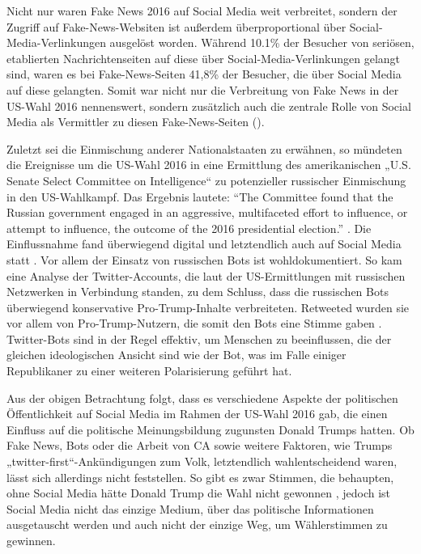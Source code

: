 Nicht nur waren Fake News 2016 auf Social Media weit verbreitet, sondern der Zugriff auf Fake-News-Websiten ist außerdem überproportional über Social-Media-Verlinkungen ausgelöst worden. Während 10.1\% der Besucher von seriösen, etablierten Nachrichtenseiten auf diese über Social-Media-Verlinkungen gelangt sind, waren es bei Fake-News-Seiten 41,8\% der Besucher, die über Social Media auf diese gelangten. Somit war nicht nur die Verbreitung von Fake News in der US-Wahl 2016 nennenswert, sondern zusätzlich auch die zentrale Rolle von Social Media als Vermittler zu diesen Fake-News-Seiten \autocite[vgl.][222]{allcott2017social} (\autocite[]{fig:newsSites}).

Zuletzt sei die Einmischung anderer Nationalstaaten zu erwähnen, so mündeten die Ereignisse um die US-Wahl 2016 in eine Ermittlung des amerikanischen „U.S. Senate Select Committee on Intelligence“ zu potenzieller russischer Einmischung in den US-Wahlkampf. Das Ergebnis lautete: “The Committee found that the Russian government engaged in an aggressive, multifaceted effort to influence, or attempt to influence, the outcome of the 2016 presidential election.” \autocite[V]{SenateRussian}. Die Einflussnahme fand überwiegend digital und letztendlich auch auf Social Media statt \autocite[vgl.][185, 190]{SenateRussian}. Vor allem der Einsatz von russischen Bots ist wohldokumentiert. So kam eine Analyse der Twitter-Accounts, die laut der US-Ermittlungen mit russischen Netzwerken in Verbindung standen, zu dem Schluss, dass die russischen Bots überwiegend konservative Pro-Trump-Inhalte verbreiteten. Retweeted wurden sie vor allem von Pro-Trump-Nutzern, die somit den Bots eine Stimme gaben \autocite[vgl.][]{badawy2018analyzing}. Twitter-Bots sind in der Regel effektiv, um Menschen zu beeinflussen, die der gleichen ideologischen Ansicht sind wie der Bot, was im Falle einiger Republikaner zu einer weiteren Polarisierung geführt hat.

Aus der obigen Betrachtung folgt, dass es verschiedene Aspekte der politischen Öffentlichkeit auf Social Media im Rahmen der US-Wahl 2016 gab, die einen Einfluss auf die politische Meinungsbildung zugunsten Donald Trumps hatten. Ob Fake News, Bots oder die Arbeit von CA sowie weitere Faktoren, wie Trumps „twitter-first“-Ankündigungen \autocite[vgl.][22]{groshek2017helping} zum Volk, letztendlich wahlentscheidend waren, lässt sich allerdings nicht feststellen. So gibt es zwar Stimmen, die behaupten, ohne Social Media hätte Donald Trump die Wahl nicht gewonnen \autocite[vgl.][]{GuardianParkinsonFN}\autocite[vgl.][]{WashingtonDeweyFN}\autocite[vgl.][]{NYMagReadFN}, jedoch ist Social Media nicht das einzige Medium, über das politische Informationen ausgetauscht werden und auch nicht der einzige Weg, um Wählerstimmen zu gewinnen. 


